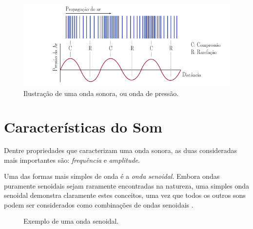 \documentclass[
    12pt,               %
    openright,          %
    oneside,
    a4paper,            
    english,            %
    brazil              %
    ]{abntex2}
\begin{document}
\begin{figure}[!htb]
  \caption{\label{fig_pressao}Ilustração de uma onda sonora, ou onda de pressão.}
  \begin{center}
  \includegraphics[scale=1.34]{images/img-3.pdf}
  \end{center}
\end{figure}

\section{Características do Som}\label{caracteristicas}

Dentre propriedades que caracterizam uma onda sonora, as duas consideradas mais importantes são: \textit{frequência} e \textit{amplitude}.

 Uma das formas mais simples de onda é a \textit{onda senoidal}. Embora ondas puramente senoidais sejam raramente encontradas na natureza, uma simples onda senoidal demonstra claramente estes conceitos, uma vez que todos os outros sons podem ser considerados como combinações de ondas senoidais \cite{soundtrack}.

\begin{figure}[!htb]
  \caption{\label{senoide}Exemplo de uma onda senoidal.}
  \begin{center}
  \end{center}
\end{figure}
\end{document}
